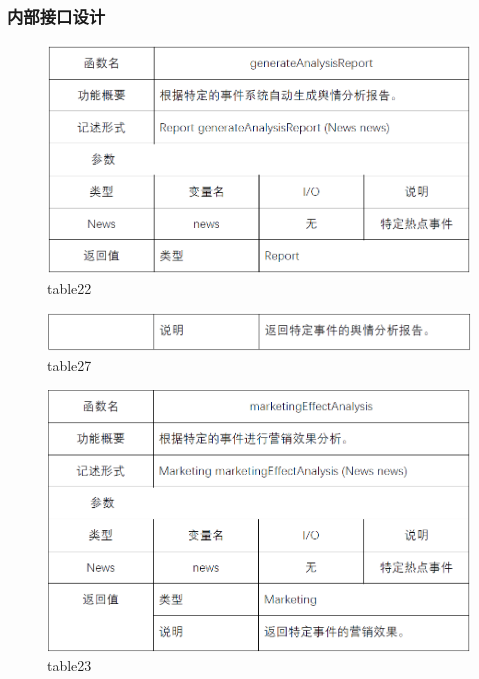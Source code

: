 \subsubsection{内部接口设计}
\begin{figure}[!htb]
	\centering
	\includegraphics[scale=1]{image/b22.png} %
	\caption{table22} %
\end{figure}
\begin{figure}[!htb]
	\centering
	\includegraphics[scale=1]{image/b27.png} %
	\caption{table27} %
\end{figure}
\begin{figure}[!htb]
	\centering
	\includegraphics[scale=1]{image/b23.png} %
	\caption{table23} %
\end{figure}
